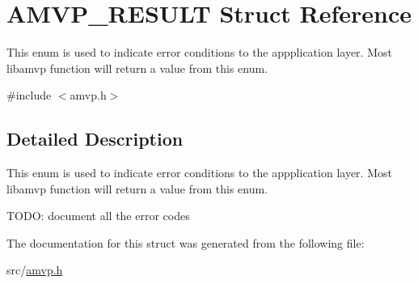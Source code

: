 \hypertarget{structAMVP__RESULT}{\section{A\-M\-V\-P\-\_\-\-R\-E\-S\-U\-L\-T Struct Reference}
\label{structAMVP__RESULT}
}


This enum is used to indicate error conditions to the appplication layer. Most libamvp function will return a value from this enum.  




{\ttfamily \#include $<$amvp.\-h$>$}



\subsection{Detailed Description}
This enum is used to indicate error conditions to the appplication layer. Most libamvp function will return a value from this enum. 

T\-O\-D\-O\-: document all the error codes 

The documentation for this struct was generated from the following file\-:\begin{DoxyCompactItemize}
\item 
src/\hyperlink{amvp_8h}{amvp.\-h}\end{DoxyCompactItemize}
